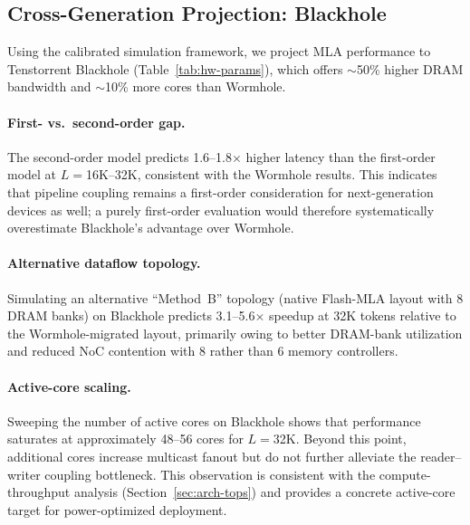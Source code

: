 \documentclass[sigconf, review, anonymous]{acmart}
\begin{document}

\subsection{Cross-Generation Projection: Blackhole}\label{sec:arch-bh}

Using the calibrated simulation framework, we project MLA performance
to Tenstorrent Blackhole (Table~\ref{tab:hw-params}), which offers
$\sim$50\% higher DRAM bandwidth and $\sim$10\% more cores than
Wormhole.

\paragraph{First- vs.\ second-order gap.}
The second-order model predicts 1.6--1.8$\times$ higher latency than
the first-order model at $L{=}$16K--32K, consistent with the Wormhole
results.  This indicates that pipeline coupling remains a first-order
consideration for next-generation devices as well; a purely first-order
evaluation would therefore systematically overestimate Blackhole's
advantage over Wormhole.

\paragraph{Alternative dataflow topology.}
Simulating an alternative ``Method~B'' topology (native Flash-MLA
layout with 8 DRAM banks) on Blackhole predicts 3.1--5.6$\times$
speedup at 32K tokens relative to the Wormhole-migrated layout,
primarily owing to better DRAM-bank utilization and reduced NoC
contention with 8 rather than 6 memory controllers.

\paragraph{Active-core scaling.}
Sweeping the number of active cores on Blackhole shows that performance
saturates at approximately 48--56 cores for $L{=}$32K.  Beyond this
point, additional cores increase multicast fanout but do not further
alleviate the reader--writer coupling bottleneck.  This observation is
consistent with the compute-throughput analysis
(Section~\ref{sec:arch-tops}) and provides a concrete active-core
target for power-optimized deployment.


\end{document}
